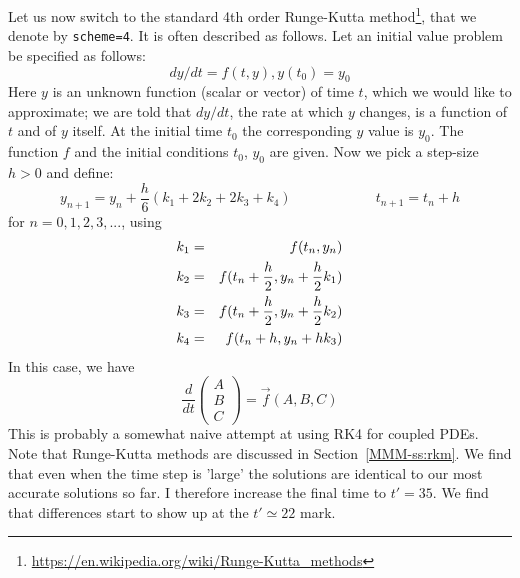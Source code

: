 Let us now switch to the standard 4th order 
Runge-Kutta method\footnote{\url{https://en.wikipedia.org/wiki/Runge-Kutta_methods}},
that we denote by {\tt scheme=4}. It is often described as follows.
Let an initial value problem be specified as follows:
\[
dy/dt = f (t,y) , y(t_0) = y_0
\]
Here $y$ is an unknown function (scalar or vector) of time $t$, 
which we would like to approximate; we are told that $dy/dt$, 
the rate at which $y$ changes, is a function of $t$ 
and of $y$ itself. At the initial time $t_0$ the corresponding $y$ value 
is $y_0$. The function $f$ and the initial conditions $t_0$, $y_0$ are given. 
Now we pick a step-size $h> 0$ and define: 
\[
y_{n+1}= y_n + \frac{h}{6}(k_1+2k_2+2k_3+k_4) 
\qquad
\qquad
\qquad
t_{n+1}=t_n + h
\]
for $n = 0, 1, 2, 3, ...$, using
\begin{eqnarray}
k_1 &=& f(t_n,y_n) \nonumber\\
k_2 &=& f(t_n+\frac{h}{2},y_n+\frac{h}{2}k_1) \nonumber\\
k_3 &=& f(t_n+\frac{h}{2},y_n+\frac{h}{2}k_2) \nonumber\\
k_4 &=& f(t_n+h,y_n+ h k_3) \nonumber
\end{eqnarray}
In this case, we have
\[
\frac{d}{dt} 
\left(
\begin{array}{c}
A\\B\\C
\end{array}
\right)
=\vec{f}(A,B,C)
\]
This is probably a somewhat naive attempt at using RK4 for coupled PDEs.
Note that Runge-Kutta methods are discussed in Section~\ref{MMM-ss:rkm}.
We find that even when the time step is 'large' the solutions are 
identical to our most accurate solutions so far. 
I therefore increase the final time to $t'=35$.
We find that differences start to show up at the $t'\simeq 22$ mark. 

